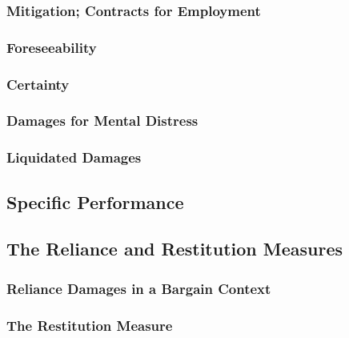 
\subsubsection{Mitigation; Contracts for Employment}

\subsubsection{Foreseeability}

\subsubsection{Certainty}

\subsubsection{Damages for Mental Distress}

\subsubsection{Liquidated Damages}

\subsection{Specific Performance}

\subsection{The Reliance and Restitution Measures}

\subsubsection{Reliance Damages in a Bargain Context}

\subsubsection{The Restitution Measure}


